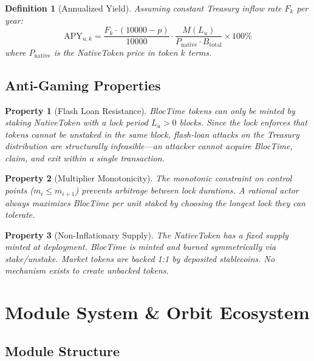 \documentclass[11pt,a4paper]{article}
\newtheorem{definition}{Definition}[section]
\newtheorem{property}{Property}[section]
\begin{document}
\begin{definition}[Annualized Yield]
Assuming constant Treasury inflow rate $F_k$ per year:
\begin{equation}
\text{APY}_{u,k} = \frac{F_k \cdot (10000 - p)}{10000} \cdot \frac{M(L_u)}{P_{\text{native}} \cdot B_{\text{total}}} \times 100\%
\label{eq:apy}
\end{equation}
where $P_{\text{native}}$ is the NativeToken price in token $k$ terms.
\end{definition}

\subsection{Anti-Gaming Properties}

\begin{property}[Flash Loan Resistance]
BlocTime tokens can only be minted by staking NativeToken with a lock period $L_u > 0$ blocks. Since the lock enforces that tokens cannot be unstaked in the same block, flash-loan attacks on the Treasury distribution are structurally infeasible---an attacker cannot acquire BlocTime, claim, and exit within a single transaction.
\end{property}

\begin{property}[Multiplier Monotonicity]
The monotonic constraint on control points ($m_i \leq m_{i+1}$) prevents arbitrage between lock durations. A rational actor always maximizes BlocTime per unit staked by choosing the longest lock they can tolerate.
\end{property}

\begin{property}[Non-Inflationary Supply]
The NativeToken has a fixed supply minted at deployment. BlocTime is minted and burned symmetrically via stake/unstake. Market tokens are backed 1:1 by deposited stablecoins. No mechanism exists to create unbacked tokens.
\end{property}

\section{Module System \& Orbit Ecosystem}
\label{sec:modules}

\subsection{Module Structure}
\end{document}
